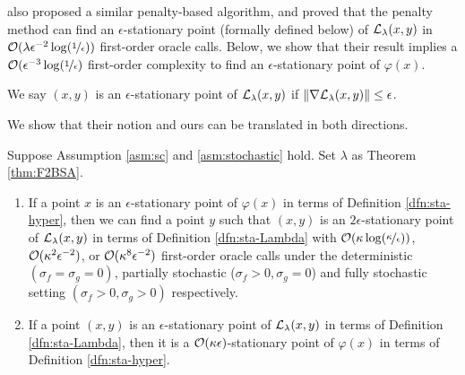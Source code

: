 \citet{shen2023penalty} also proposed a similar penalty-based algorithm, and proved that the penalty method can find an $\epsilon$-stationary point (formally defined below) of ${\mathcal{L}}_{\lambda}(x,y)$ in ${\mathcal{O}}(\lambda \epsilon^{-2} \log (\nicefrac{1}{\epsilon}))$ first-order oracle calls.
Below, we show that their result implies a ${\mathcal{O}}(\epsilon^{-3} \log (\nicefrac{1}{\epsilon})$ first-order complexity to find an $\epsilon$-stationary point of $\varphi(x)$. 


\begin{dfn} \label{dfn:sta-Lambda}
We say $(x,y)$ is an $\epsilon$-stationary point of ${\mathcal{L}}_{\lambda}(x,y)$ if $\Vert \nabla {\mathcal{L}}_{\lambda}(x,y) \Vert \le \epsilon$.
\end{dfn}

We show that their notion and ours can be translated in both directions.

\begin{lem} \label{lem:translate}
Suppose Assumption \ref{asm:sc} and \ref{asm:stochastic} hold. Set $\lambda$ as Theorem \ref{thm:F2BSA}.
\begin{enumerate}
    \item If a point $x$ is an $\epsilon$-stationary point of $\varphi(x)$ in terms of Definition \ref{dfn:sta-hyper}, then we can find a point $y$ such that $(x,y)$ is an $2\epsilon$-stationary point of ${\mathcal{L}}_{\lambda}(x,y)$ in terms of Definition \ref{dfn:sta-Lambda} with ${\mathcal{O}}(\kappa \log(\nicefrac{\kappa}{\epsilon}))$,
    ${\mathcal{O}}(\kappa^2 \epsilon^{-2})$, or ${\mathcal{O}}(\kappa^8 \epsilon^{-2})$ first-order oracle calls under the deterministic $(\sigma_f = \sigma_g=0)$, partially stochastic ($\sigma_f >0, \sigma_g=0$) and fully stochastic setting $(\sigma_f >0, \sigma_g>0)$ respectively.
    \item If a point $(x,y)$ is an $\epsilon$-stationary point of ${\mathcal{L}}_{\lambda}(x,y)$ in terms of Definition \ref{dfn:sta-Lambda}, then it is a ${\mathcal{O}}(\kappa \epsilon)$-stationary point of $\varphi(x)$ in terms of Definition \ref{dfn:sta-hyper}.
\end{enumerate}
\end{lem}

